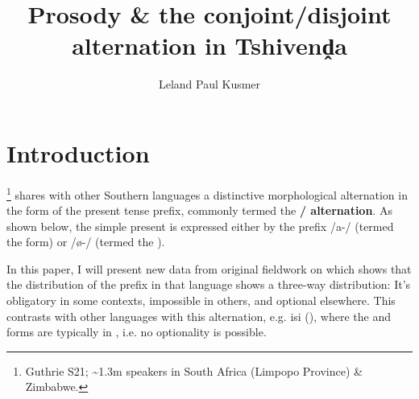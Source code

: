 \documentclass[output=paper 
,modfonts
,nonflat]{langsci/langscibook}
\title{Prosody \& the conjoint\slash disjoint alternation in {T}shivenḓa}
\author{%
	Leland Paul Kusmer\affiliation{University of Massachusetts at Amherst}
}
\begin{document}
\section{Introduction}\label{sec:kusmer:intro}

\footnote{Guthrie S21; \textasciitilde 1.3m speakers in South
Africa (Limpopo Province) \& Zimbabwe.} shares with other Southern 
	languages a distinctive morphological alternation in the form of the
	present tense prefix, commonly termed the \textbf{\slash {}
	alternation}. As shown below, the simple present is expressed either by the
	prefix /a-/ (termed the  form) or /\o-/ (termed the ).




In this paper, I will present new data from original fieldwork on 
which shows that the distribution of the  prefix in that language shows
a three-way distribution: It's obligatory in some contexts, impossible in
others, and optional elsewhere. This contrasts with other languages with this
alternation, e.g. isi (\citealt{Halpert2015}), where the  and
 forms are typically in , i.e. no optionality
is possible. 
\end{document}
